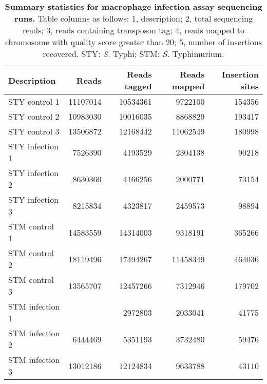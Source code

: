 %
\begin{table}
   \tiny
   \centering
   \noindent
    \caption[Summary statistics for macrophage infection assay sequencing runs]{\textbf{Summary statistics for macrophage infection assay sequencing runs.} Table columns as follows: 1, description; 2, total sequencing reads; 3, reads containing transposon tag; 4, reads mapped to chromosome with quality score greater than 20; 5, number of insertions recovered. STY: \textit{S.} Typhi; STM: \textit{S.} Typhimurium. }
    \begin{tabular}{ l
    				r
				r
				r
				r
				}
   
    \\
     \toprule
    \textbf{Description} & \textbf{Reads} & \textbf{Reads tagged} & \textbf{Reads mapped} & \textbf{Insertion sites} \\
    \midrule
    STY control 1 & 11107014 & 10534361 & 9722100 & 154356\\
    STY control 2 & 10983030 & 10016035 & 8868829 & 193417\\
    STY control 3 & 13506872 & 12168442 & 11062549 & 180998\\
    STY infection 1 & 7526390 & 4193529 & 2304138 & 90218\\
    STY infection 2 & 8630360 & 4166256 & 2000771 & 73154\\
    STY infection 3 & 8215834 & 4323817 & 2459573 & 98894\\
    STM control 1 & 14583559 & 14314003 & 9318191 & 365266\\
    STM control 2 & 18119496 & 17494267 & 11458349 & 464036\\
    STM control 3 & 13565707 & 12457266 & 7312946 & 179702\\
    STM infection 1 & & 2972803 & 2033041 & 41775\\
    STM infection 2 & 6444469 & 5351193 & 3732480 & 59476\\
    STM infection 3 & 13012186 & 12124834 & 9633788 & 43110\\
    \bottomrule
    \end{tabular}%
    \label{tab:readmap}%
\end{table}


